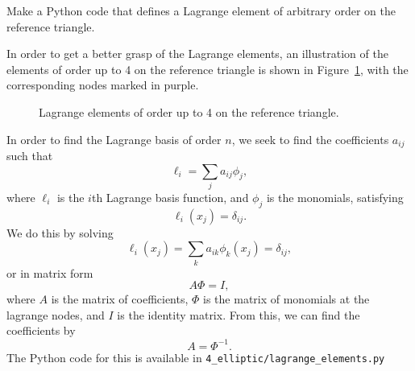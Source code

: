 \begin{exercise}
    Make a Python code that defines a Lagrange element of arbitrary order on the reference triangle.
\end{exercise}

\begin{solution}
    In order to get a better grasp of the Lagrange elements, an illustration of the elements of order up to 4 on the reference triangle is shown in Figure~\ref{fig:lagrange_elements}, with the corresponding nodes marked in purple.

    \begin{figure}[!h]
        \centering
        
        \caption{Lagrange elements of order up to 4 on the reference triangle.\label{fig:lagrange_elements}}
    \end{figure}

    In order to find the Lagrange basis of order $n$, we seek to find the coefficients $a_{ij}$ such that
    \begin{equation*}
        \ell_i = \sum_{j} a_{ij} \phi_j,
    \end{equation*}
    where $\ell_i$ is the $i$th Lagrange basis function, and $\phi_j$ is the monomials, satisfying
    \begin{equation*}
        \ell_i(x_j) = \delta_{ij}.
    \end{equation*}
    We do this by solving
    \begin{equation*}
        \ell_i(x_j) = \sum_{k} a_{ik} \phi_k(x_j) = \delta_{ij},
    \end{equation*}
    or in matrix form
    \begin{equation*}
        A \Phi = I,
    \end{equation*}
    where $A$ is the matrix of coefficients, $\Phi$ is the matrix of monomials at the lagrange nodes, and $I$ is the identity matrix.
    From this, we can find the coefficients by
    \begin{equation*}
        A = \Phi^{-1}.
    \end{equation*}
    The Python code for this is available in \verb|4_elliptic/lagrange_elements.py|
\end{solution}